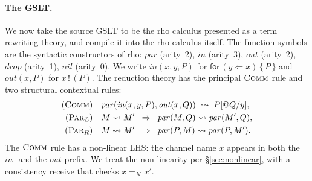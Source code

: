 \documentclass[11pt]{article}
\theoremstyle{plain}
\theoremstyle{definition}
\theoremstyle{remark}
\newcommand{\rew}{\leadsto}
\newcommand{\Names}{\mathcal{N}}
\newcommand{\Send}[2]{#1 \,!\, (#2)}
\newcommand{\Recv}[3]{\mathsf{for}\,(#1 \Leftarrow #2)\,\{\,#3\,\}}
\begin{document}
\paragraph{The GSLT.}
We now take the source GSLT to be the rho calculus presented as a term
rewriting theory, and compile it into the rho calculus itself. The
function symbols are the syntactic constructors of rho:
$\mathit{par}$ (arity~2), $\mathit{in}$ (arity~3), $\mathit{out}$
(arity~2), $\mathit{drop}$ (arity~1), $\mathit{nil}$ (arity~0). We
write $\mathit{in}(x, y, P)$ for $\Recv{y}{x}{P}$ and $\mathit{out}(x,
P)$ for $\Send{x}{P}$. The reduction theory has the principal
$\textsc{Comm}$ rule and two structural contextual rules:
\begin{align*}
  (\textsc{Comm}) \quad
    & \mathit{par}(\mathit{in}(x, y, P), \mathit{out}(x, Q))
      \;\rew\; P[@Q / y], \\
  (\textsc{Par}_{L}) \quad
    & M \rew M' \;\;\Rightarrow\;\;
      \mathit{par}(M, Q) \rew \mathit{par}(M', Q), \\
  (\textsc{Par}_{R}) \quad
    & M \rew M' \;\;\Rightarrow\;\;
      \mathit{par}(P, M) \rew \mathit{par}(P, M').
\end{align*}
The $\textsc{Comm}$ rule has a non-linear LHS: the channel name $x$
appears in both the $\mathit{in}$- and the $\mathit{out}$-prefix. We
treat the non-linearity per \S\ref{sec:nonlinear}, with a consistency
receive that checks $x =_{\Names} x'$.
\end{document}

